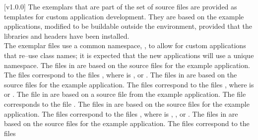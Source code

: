 [v1.0.0]
%
The exemplars that are part of the \mplusm{} set of source files are
provided as templates for custom application development.
They are based on the example applications, modified to be buildable outside the \mplusm{}
environment, provided that the \mplusm{} libraries and headers have been installed.\\

The exemplar files use a common namespace, , to allow for custom
applications that re--use class names; it is expected that the new applications will use
a unique namespace.
The files in  are based on the source files for the
 example application.
The files  correspond to the files
, where  is ,
 or .
The files in  are based on the source files for the
 example application.
The files  correspond to the files
, where  is  or .
The file in  are based on a source file from the
 example application.
The file  corresponds to the file
.
The files in  are based on the source files for the
 example application.
The files  correspond to the files
, where  is ,
,  or .
The files in  are based on the source files for the
 example application.
The files  correspond to the files
